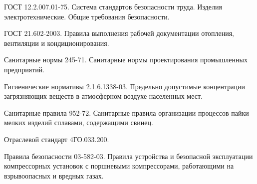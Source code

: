     ГОСТ 12.2.007.01-75.
                                    Система стандартов безопасности труда.
                                    Изделия электротехнические.
                                    Общие требования безопасности.

  ГОСТ 21.602-2003.
                            Правила выполнения рабочей документации
                            отопления, вентиляции и кондиционирования.

   Санитарные нормы 245-71.
                                    Санитарные нормы проектирования промышленных
                                    предприятий.

  Гигиенические нормативы 2.1.6.1338-03.
                                        Предельно допустимые концентрации загрязняющих
                                        веществ в атмосферном воздухе населенных мест.

   Санитарные правила 952-72.
                                    Санитарные правила организации процессов пайки
                                    мелких изделий сплавами, содержащими свинец.

   Отраслевой стандарт 4ГО.033.200.

  Правила безопасности 03-582-03.
                                Правила устройства и безопасной эксплуатации
                                компрессорных установок с поршневыми компрессорами,
                                работающими на взрывоопасных и вредных газах.
